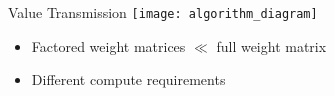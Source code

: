 \documentclass[handout,t]{beamer}
\begin{document}

  \begin{frame}{Value Transmission}
    \vfill
    \hspace*{-.15\textwidth}\texttt{[image: algorithm\_diagram]}
    \vfill
    \pause
    \begin{itemize}
      \item Factored weight matrices $\ll$ full weight matrix
      \item Different compute requirements
    \end{itemize}
  \end{frame}



\end{document}
